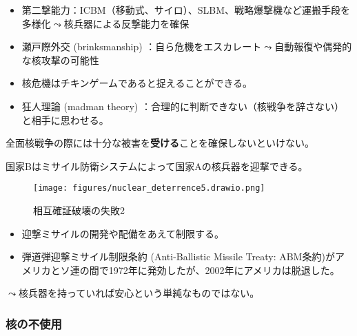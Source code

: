\documentclass[
  xelatex,
  ja=standard]{bxjsarticle}
\providecommand{\tightlist}{%
  \setlength{\itemsep}{0pt}\setlength{\parskip}{0pt}}\usepackage{longtable,booktabs,array}
\begin{document}
\begin{itemize}
\tightlist
\item
  第二撃能力：ICBM（移動式、サイロ）、SLBM、戦略爆撃機など運搬手段を多様化\(\leadsto\)核兵器による反撃能力を確保
\item
  瀬戸際外交 (brinksmanship)
  ：自ら危機をエスカレート\(\leadsto\)自動報復や偶発的な核攻撃の可能性\citep{schelling2008, schelling2018}
\item
  核危機はチキンゲームであると捉えることができる。
\item
  狂人理論 (madman theory)
  ：合理的に判断できない（核戦争を辞さない）と相手に思わせる。
\end{itemize}

全面核戦争の際には十分な被害を\textbf{受ける}ことを確保しないといけない。

\begin{tcolorbox}[enhanced jigsaw, coltitle=black, colbacktitle=quarto-callout-tip-color!10!white, colframe=quarto-callout-tip-color-frame, bottomrule=.15mm, toprule=.15mm, breakable, leftrule=.75mm, toptitle=1mm, left=2mm, arc=.35mm, bottomtitle=1mm, opacitybacktitle=0.6, titlerule=0mm, title=\textcolor{quarto-callout-tip-color}{\faLightbulb}\hspace{0.5em}{相互確証破壊の失敗2}, colback=white, opacityback=0, rightrule=.15mm]

国家Bはミサイル防衛システムによって国家Aの核兵器を迎撃できる。

\end{tcolorbox}

\begin{figure}[htpb]

{\centering \texttt{[image: figures/nuclear\_deterrence5.drawio.png]}

}

\caption{相互確証破壊の失敗2}

\end{figure}

\begin{itemize}
\tightlist
\item
  迎撃ミサイルの開発や配備をあえて制限する。
\item
  弾道弾迎撃ミサイル制限条約 (Anti-Ballistic Missile Treaty:
  ABM条約)がアメリカとソ連の間で1972年に発効したが、2002年にアメリカは脱退した。
\end{itemize}

\(\leadsto\)核兵器を持っていれば安心という単純なものではない。

\hypertarget{ux6838ux306eux4e0dux4f7fux7528}{%
\subsubsection{核の不使用}\label{ux6838ux306eux4e0dux4f7fux7528}}
\end{document}
